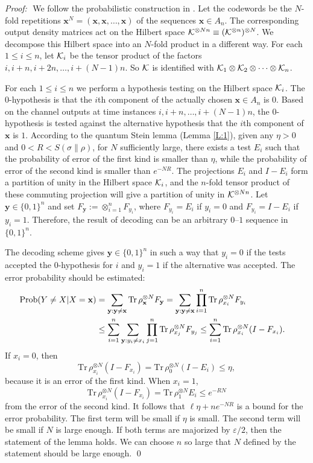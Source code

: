 \documentclass[12pt,a4paper]{article}
\def\Tr{{\mathrm{Tr}}}
\def\Prob{{\mathrm{Prob}}}
\def\eps{\varepsilon}
\def\iK{{\cal K}}
\def\ot{\otimes}
\def\proof{{\it Proof:}\,\,}
\def\bfx{\mathbf{x}}
\def\bfy{\mathbf{y}}
\begin{document}
\proof
We follow the probabilistic construction in \cite{Ve}.
Let the codewords be the $N$-fold repetitions $\bfx^N=(\bfx,\bfx,\dots,\bfx)$ of
the sequences $\bfx \in A_n$. The corresponding output density matrices
act on the Hilbert space $\iK^{\ot Nn}\equiv (\iK^{\ot n})^{\ot N}$. We
decompose this Hilbert space into an $N$-fold product in a different way.
For each $1 \le i \le n$, let $\iK_i$ be the tensor product of the factors
$i,i+n,i+2n,\dots, i+(N-1)n$. So $\iK$ is identified with $\iK_1 \ot \iK_2
\ot \dots \ot \iK_n$.

For each $1 \le i \le n$ we perform a hypothesis testing on the Hilbert space
$\iK_i$. The 0-hypothesis is that the $i$th component of the
actually chosen $\bfx \in A_n$ is $0$. Based on the channel outputs at
time instances $i,i+n,\dots, i+(N-1)n$, the  0-hypothesis is tested against the
alternative hypothesis that the $i$th component of $\bfx$
is $1$. According to the quantum Stein lemma (Lemma \ref{L:1}),
given any $\eta>0$ and $0<R < S(\sigma\|\rho)$, for $N$ sufficiently
large, there exists a test $E_i$ such that the probability of error of
the first kind is smaller than $\eta$, while the probability of error of
the second kind is smaller than $e^{-NR}$. The projections $E_i$ and $I-E_i$ form
a partition of unity in the Hilbert space $\iK_i$, and the $n$-fold tensor
product of these commuting projection will give a partition of unity
in $\iK^{\ot Nn}$. Let $\bfy \in \{0,1\}^n$ and set $F_{\bfy}:= \ot_{i=1}^n F_{y_i}$,
where $F_{y_i}=E_i$ if $y_i=0$ and $F_{y_i}=I-E_i$ if $y_i=1$. Therefore,
the result of decoding can be an arbitrary $0$--$1$ sequence in $\{0,1\}^n$.

The decoding scheme gives $\bfy \in \{0,1\}^n$ in such a way that $y_i=0$
if the tests accepted the 0-hypothesis for $i$ and $y_i=1$ if the alternative was
accepted. The error probability should be estimated:
\begin{align*}
\Prob(Y\ne X|X=\bfx)&=
\sum_{\bfy:\bfy\ne \bfx} \Tr\,\rho_\bfx^{\ot N} F_\bfy
=\sum_{\bfy:\bfy\ne \bfx}\prod_{i=1}^n \Tr\,\rho_{x_i}^{\ot N} F_{y_i}  \cr
&\le \sum_{i=1}^n \sum_{\bfy: y_i \ne x_i}
\prod_{j=1}^n \Tr\,\rho_{x_j}^{\ot N} F_{y_j}
\le \sum_{i=1}^n \Tr\,\rho_{x_i}^{\ot N} (I-F_{x_i}).
\end{align*}
If $x_i=0$, then
$$
\Tr\, \rho_{x_i}^{\ot N} (I-F_{x_i}) = \Tr\, \rho_{0}^{\ot N} (I-E_{i}) \le \eta,
$$
because it is an error of the first kind. When $x_i=1$,
$$
\Tr\, \rho_{x_i}^{\ot N} (I-F_{x_i}) = \Tr\, \rho_{1}^{\ot N} E_{i} \le e^{-R N}
$$
from the error of the second kind. It follows that
$\ell \eta +ne^{-NR}$ 
is a bound for the error probability. The first term will be small
if $\eta$ is small. The second term will be small if $N$ is large enough. If both
terms are majorized by $\eps/2$, then the statement of the lemma holds.
We can choose $n$ so large that $N$ defined by the statement should be
large enough. \qed
\end{document}
